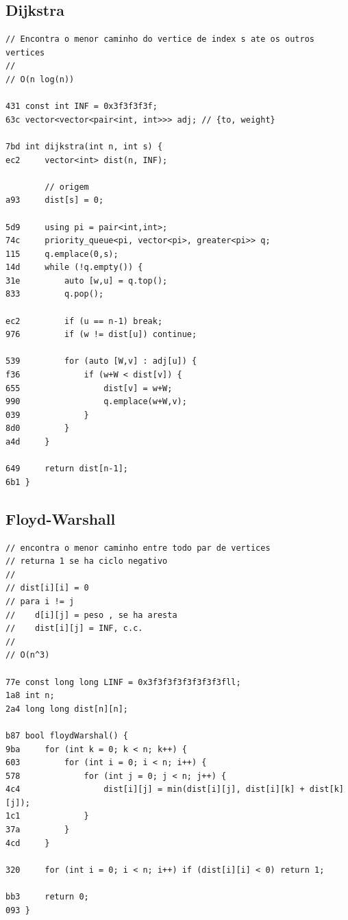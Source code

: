 \documentclass[11pt, a4paper, twoside]{article}
\begin{document}
\subsection{Dijkstra}
\begin{lstlisting}
// Encontra o menor caminho do vertice de index s ate os outros vertices
//
// O(n log(n))

431 const int INF = 0x3f3f3f3f;
63c vector<vector<pair<int, int>>> adj; // {to, weight}

7bd int dijkstra(int n, int s) {
ec2     vector<int> dist(n, INF);
    
        // origem
a93     dist[s] = 0;
    
5d9     using pi = pair<int,int>;
74c     priority_queue<pi, vector<pi>, greater<pi>> q;
115     q.emplace(0,s);
14d     while (!q.empty()) {
31e         auto [w,u] = q.top();
833         q.pop();
    
ec2         if (u == n-1) break;
976         if (w != dist[u]) continue;
    
539         for (auto [W,v] : adj[u]) {
f36             if (w+W < dist[v]) {
655                 dist[v] = w+W;
990                 q.emplace(w+W,v);
039             }
8d0         }
a4d     }
    
649     return dist[n-1];
6b1 }
\end{lstlisting}

\subsection{Floyd-Warshall}
\begin{lstlisting}
// encontra o menor caminho entre todo par de vertices
// returna 1 se ha ciclo negativo
//
// dist[i][i] = 0
// para i != j 
//    d[i][j] = peso , se ha aresta
//    dist[i][j] = INF, c.c.
//
// O(n^3)

77e const long long LINF = 0x3f3f3f3f3f3f3f3fll;
1a8 int n;
2a4 long long dist[n][n];

b87 bool floydWarshal() {
9ba     for (int k = 0; k < n; k++) {
603         for (int i = 0; i < n; i++) {
578             for (int j = 0; j < n; j++) {
4c4                 dist[i][j] = min(dist[i][j], dist[i][k] + dist[k][j]);
1c1             }
37a         }
4cd     }
    
320     for (int i = 0; i < n; i++) if (dist[i][i] < 0) return 1;
    
bb3     return 0;
093 }
\end{lstlisting}
\end{document}
